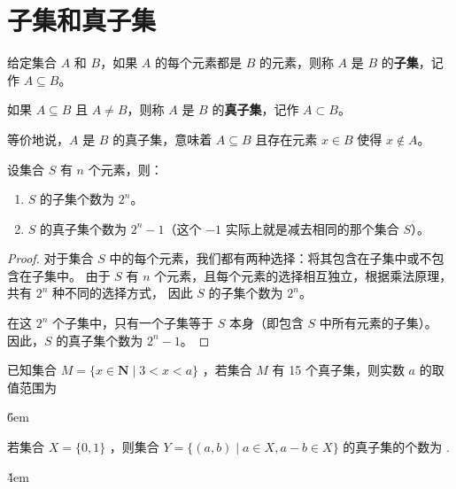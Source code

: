 \section{子集和真子集}

\begin{definition}[子集和真子集]
    给定集合 $A$ 和 $B$，如果 $A$ 的每个元素都是 $B$ 的元素，则称 $A$ 是 $B$ 的\textbf{子集}，记作 $A \subseteq B$。

    如果 $A \subseteq B$ 且 $A \neq B$，则称 $A$ 是 $B$ 的\textbf{真子集}，记作 $A \subset B$。

    等价地说，$A$ 是 $B$ 的真子集，意味着 $A \subseteq B$ 且存在元素 $x \in B$ 使得 $x \notin A$。
\end{definition}

\begin{theorem}[子集和真子集的个数]
    设集合 $S$ 有 $n$ 个元素，则：
    \begin{enumerate}
        \item $S$ 的子集个数为 $2^n$。
        \item $S$ 的真子集个数为 $2^n - 1$（这个 $-1$ 实际上就是减去相同的那个集合 $S$）。
    \end{enumerate}

    \begin{proof}
        对于集合 $S$ 中的每个元素，我们都有两种选择：将其包含在子集中或不包含在子集中。
        由于 $S$ 有 $n$ 个元素，且每个元素的选择相互独立，根据乘法原理，共有 $2^n$ 种不同的选择方式，
        因此 $S$ 的子集个数为 $2^n$。

        在这 $2^n$ 个子集中，只有一个子集等于 $S$ 本身（即包含 $S$ 中所有元素的子集）。
        因此，$S$ 的真子集个数为 $2^n - 1$。
    \end{proof}
\end{theorem}

\begin{example}
    已知集合 $M=\{x \in \mathbf{N} \mid 3<x<a\}$ ，若集合 $M$ 有 15 个真子集，则实数 $a$ 的取值范围为 \underline{\qquad}
\end{example}

\v{6em}

\begin{example}
    若集合 $X=\{0,1\}$ ，则集合 $Y=\{(a, b) \mid a \in X, a-b \in X\}$ 的真子集的个数为 \underline{\qquad}.
\end{example}

\v{4em}
